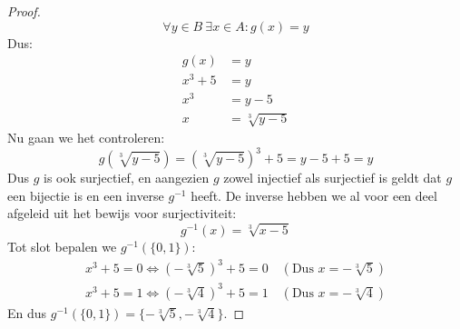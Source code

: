 \documentclass{article}
\begin{document}
\begin{enumerate}[label=\alph*)]
\begin{proof}
                \[\forall y \in B \ \exists x \in A : g(x) = y\]
                Dus:
                \begin{align*}
                    g(x) &= y \\
                    x^3 + 5 &= y \\
                    x^3 &= y - 5 \\
                    x &= \sqrt[3]{y-5}
                \end{align*}
                Nu gaan we het controleren:
                \[g(\sqrt[3]{y-5})=(\sqrt[3]{y-5})^3 + 5 = y-5 + 5 = y\]
                Dus $g$ is ook surjectief, en aangezien $g$ zowel injectief als surjectief is geldt dat $g$ een bijectie is en een inverse $g^{-1}$ heeft.
                De inverse hebben we al voor een deel afgeleid uit het bewijs voor surjectiviteit:
                \[g^{-1}(x) = \sqrt[3]{x-5}\]
                Tot slot bepalen we $g^{-1}(\{0, 1\})$:
                \begin{align*}
                x^3 + 5 = 0 \Leftrightarrow (-\sqrt[3]{5})^3 + 5 = 0 \quad (\text{Dus $x=-\sqrt[3]{5}$})  \\
                x^3 + 5 = 1 \Leftrightarrow (-\sqrt[3]{4})^3 + 5 = 1 \quad (\text{Dus $x=-\sqrt[3]{4}$}) 
                \end{align*}
                En dus $g^{-1}(\{0,1\}) = \{-\sqrt[3]{5}, -\sqrt[3]{4}\}$.
            \end{proof}
    \end{enumerate}
\end{document}
